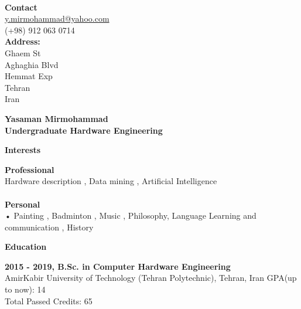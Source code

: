 \documentclass[a4paper,12pt,final]{memoir}
\newcommand{\Sep}{\vspace{1.5em}}
\newcommand{\SmallSep}{\vspace{0.5em}}
\newenvironment{AboutMe}
	{\ignorespaces\textbf{\color{RoyalBlue} About me}}
	{\Sep\ignorespacesafterend}
\newcommand{\CVSection}[1]
	{\Large\textbf{#1}\par
	\SmallSep\normalsize\normalfont}
\newcommand{\CVItem}[1]
	{\textbf{\color{RoyalBlue} #1}}
\begin{document}


\begin{flushright}\small

	
	 \CVItem{\\ Contact} \\
	 
	\url{y.mirmohammad@yahoo.com}  \\
  (+98) 912 063 0714  \\

	\CVItem{Address:} \\
	Ghaem St \\
	Aghaghia Blvd \\
	Hemmat Exp  \\
	Tehran\\
	Iran 
	
\end{flushright}\normalsize
\framebreak


\Huge\bfseries {\color{RoyalBlue} Yasaman Mirmohammad} \\
\Large\bfseries  Undergraduate Hardware Engineering \\

\normalsize\normalfont


\CVSection{Interests}
	\CVItem{Professional}
	\\
 Hardware description , Data mining , Artificial Intelligence \\
	   
	\\
	\CVItem{Personal}
	\\
	•	Painting , Badminton , Music ,  Philosophy, Language Learning and communication , History 
	
\Sep

\CVSection{Education}
\CVItem{2015 - 2019, B.Sc. in Computer Hardware Engineering}\\
AmirKabir University of Technology (Tehran Polytechnic), Tehran, Iran
GPA(up to now): 14 \\
Total Passed Credits: 65
\SmallSep
\end{document}
